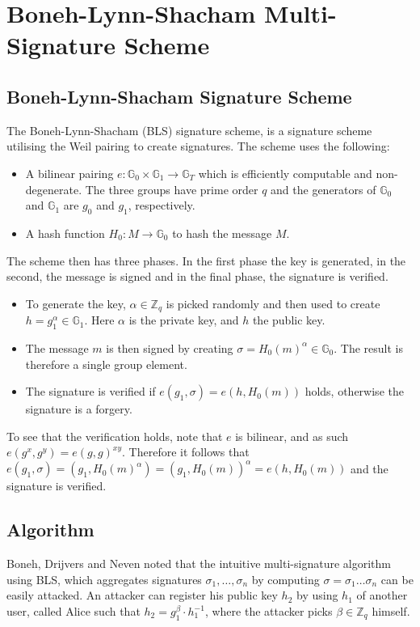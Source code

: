 \chapter{Boneh-Lynn-Shacham Multi-Signature Scheme} \label{BLSMulti}
\section{Boneh-Lynn-Shacham Signature Scheme}
The Boneh-Lynn-Shacham \cite{BLS} (BLS) signature scheme, is a signature scheme utilising the Weil pairing to create signatures. The scheme uses the following:
\begin{itemize}
	\item A bilinear pairing $e:\mathbb{G}_0 \times \mathbb{G}_1 \to \mathbb{G}_T$ which is efficiently computable and non-degenerate. The three groups have prime order $q$ and the generators of $\mathbb{G}_0$ and $\mathbb{G}_1$ are $g_0$ and $g_1$, respectively.
	\item A hash function $H_0:M\to \mathbb{G}_0$ to hash the message $M$.
\end{itemize}
The scheme then has three phases. In the first phase the key is generated, in the second, the message is signed and in the final phase, the signature is verified.
\begin{itemize}
	\item To generate the key, $\alpha \in \mathbb{Z}_q$ is picked randomly and then used to create $h=g_1^\alpha\in\mathbb{G}_1$. Here $\alpha$ is the private key, and $h$ the public key.
	\item The message $m$ is then signed by creating $\sigma=H_0(m)^\alpha\in\mathbb{G}_0$. The result is therefore a single group element.
	\item The signature is verified if $e(g_1,\sigma)=e(h,H_0(m))$ holds, otherwise the signature is a forgery.
\end{itemize}
To see that the verification holds, note that $e$ is bilinear, and as such $e(g^x,g^y)=e(g,g)^{xy}$. Therefore it follows that $e(g_1,\sigma)=(g_1,H_0(m)^\alpha)=(g_1,H_0(m))^\alpha=e(h,H_0(m))$ and the signature is verified.
\section{Algorithm}
Boneh, Drijvers and Neven \cite{BLSMulti} noted that the intuitive multi-signature algorithm using BLS, which aggregates signatures $\sigma_1,\dots,\sigma_n$ by computing $\sigma=\sigma_1\dots\sigma_n$ can be easily attacked. An attacker can register his public key $h_2$ by using $h_1$ of another user, called Alice such that $h_2=g_1^\beta\cdot h_1^{-1}$, where the attacker picks $\beta\in\mathbb{Z}_q$ himself.

